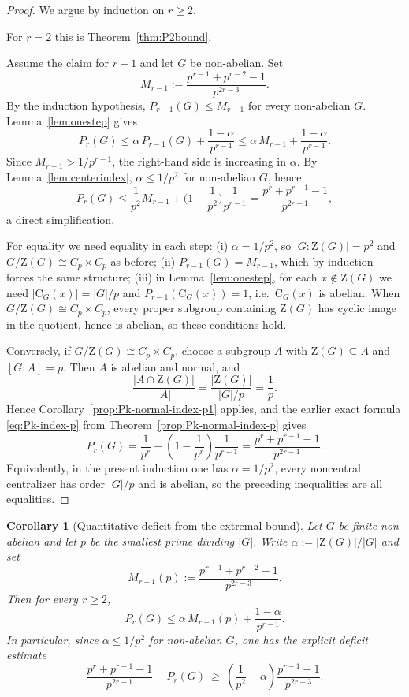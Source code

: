 \documentclass[11pt]{article}
\newtheorem{corollary}[theorem]{Corollary}
\theoremstyle{definition}
\theoremstyle{remark}
\theoremstyle{definition}
\theoremstyle{plain}
\newcommand{\Z}{\mathrm{Z}}
\newcommand{\C}{\mathrm{C}}
\begin{document}
\begin{proof}
We argue by induction on $r\ge 2$.

For $r=2$ this is Theorem~\ref{thm:P2bound}.

Assume the claim for $r-1$ and let $G$ be non-abelian. Set
\[
M_{r-1}:=\frac{p^{r-1}+p^{r-2}-1}{p^{2r-3}}.
\]
By the induction hypothesis, $P_{r-1}(G)\le M_{r-1}$ for every non-abelian $G$.
Lemma~\ref{lem:onestep} gives
\[
P_r(G)\le \alpha\,P_{r-1}(G)+\frac{1-\alpha}{p^{r-1}}
\le \alpha\,M_{r-1}+\frac{1-\alpha}{p^{r-1}}.
\]
Since $M_{r-1}>1/p^{r-1}$, the right-hand side is increasing in $\alpha$.
By Lemma~\ref{lem:centerindex}, $\alpha\le 1/p^2$ for non-abelian $G$, hence
\[
P_r(G)\le \frac{1}{p^2}M_{r-1}+\Big(1-\frac{1}{p^2}\Big)\frac{1}{p^{r-1}}
=\frac{p^r+p^{r-1}-1}{p^{2r-1}},
\]
a direct simplification.

For equality we need equality in each step:
(i) $\alpha=1/p^2$, so $|G:\Z(G)|=p^2$ and $G/\Z(G)\cong C_p\times C_p$ as before;
(ii) $P_{r-1}(G)=M_{r-1}$, which by induction forces the same structure;
(iii) in Lemma~\ref{lem:onestep}, for each $x\notin\Z(G)$ we need $|\C_G(x)|=|G|/p$ and
$P_{r-1}(\C_G(x))=1$, i.e.\ $\C_G(x)$ is abelian. When $G/\Z(G)\cong C_p\times C_p$, every
proper subgroup containing $\Z(G)$ has cyclic image in the quotient, hence is abelian,
so these conditions hold.

Conversely, if $G/\Z(G)\cong C_p\times C_p$, choose a subgroup $A$ with $\Z(G)\subseteq A$ and $[G:A]=p$.
Then $A$ is abelian and normal, and
\[
\frac{|A\cap \Z(G)|}{|A|}=\frac{|\Z(G)|}{|G|/p}=\frac1p.
\]
Hence Corollary~\ref{prop:Pk-normal-index-p1} applies, and the earlier exact formula \eqref{eq:Pk-index-p} from Theorem~\ref{prop:Pk-normal-index-p} gives
\[
P_r(G)=\frac{1}{p^r}+\left(1-\frac{1}{p^r}\right)\frac{1}{p^{r-1}}
=\frac{p^r+p^{r-1}-1}{p^{2r-1}}.
\]
Equivalently, in the present induction one has $\alpha=1/p^2$, every noncentral centralizer has order $|G|/p$
and is abelian, so the preceding inequalities are all equalities.
\end{proof}

\begin{corollary}[Quantitative deficit from the extremal bound]\label{cor:deficit-alpha}
Let $G$ be finite non-abelian and let $p$ be the smallest prime dividing $|G|$.
Write $\alpha:=|\Z(G)|/|G|$ and set
\[
M_{r-1}(p):=\frac{p^{r-1}+p^{r-2}-1}{p^{2r-3}}.
\]
Then for every $r\ge 2$,
\[
P_r(G)\le \alpha\,M_{r-1}(p)+\frac{1-\alpha}{p^{r-1}}.
\]
In particular, since $\alpha\le 1/p^2$ for non-abelian $G$, one has the explicit deficit estimate
\[
\frac{p^r+p^{r-1}-1}{p^{2r-1}}-P_r(G)
\ \ge\
\left(\frac{1}{p^2}-\alpha\right)\frac{p^{r-1}-1}{p^{2r-3}}.
\]
\end{corollary}
\end{document}
